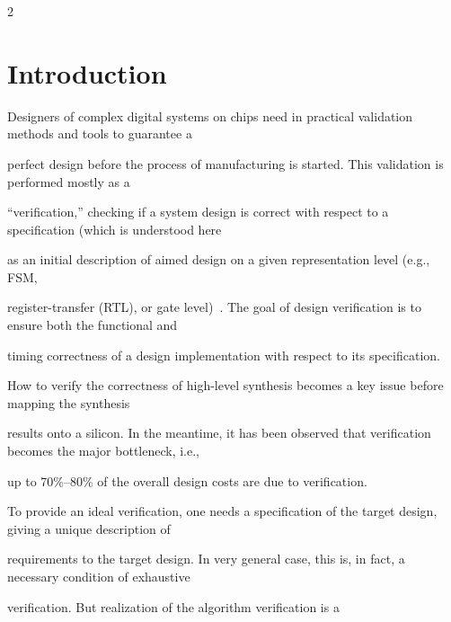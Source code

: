       \begin{multicols}{2}





      \label{st\stat}











\section{Introduction}





\noindent


Designers of complex digital systems on chips need in practical validation methods and tools to guarantee a


perfect design before the process of manufacturing is started. This validation is performed mostly as a


``veri\-fi\-cation,'' checking if a system design is correct with respect to a specification (which is understood here


as an initial description of aimed design on a given representation level (e.g., FSM,


register-transfer (RTL), or gate level)~\cite{1bar}. The goal of design verification is to ensure both the functional and


timing correctness of a design implementation with respect to its specification.





    How to verify the correctness of high-level synthesis becomes a key issue before mapping the synthesis


results onto a silicon. In the meantime, it has been observed that verification becomes the major bottleneck, i.e.,


up to 70\%--80\% of the overall design costs are due to verification.





    To provide an ideal verification, one needs a specification of the target design, giving a unique description of


requirements to the target design. In very general case, this is, in fact, a necessary condition of exhaustive


verification. But realization of the algorithm verification is a



\end{multicols}
